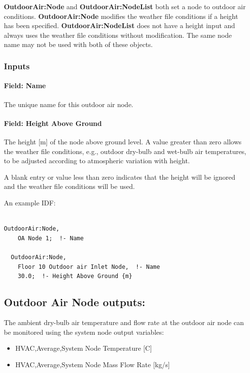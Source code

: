 \textbf{OutdoorAir:Node} and \textbf{OutdoorAir:NodeList} both set a node to outdoor air conditions. \textbf{OutdoorAir:Node} modifies the weather file conditions if a height has been specified. \textbf{OutdoorAir:NodeList} does not have a height input and always uses the weather file conditions without modification. The same node name may not be used with both of these objects.

\subsubsection{Inputs}\label{inputs-5-001}

\paragraph{Field: Name}\label{field-name-5-001}

The unique name for this outdoor air node.

\paragraph{Field: Height Above Ground}\label{field-height-above-ground}

The height {[}m{]} of the node above ground level. A value greater than zero allows the weather file conditions, e.g., outdoor dry-bulb and wet-bulb air temperatures, to be adjusted according to atmospheric variation with height.

A blank entry or value less than zero indicates that the height will be ignored and the weather file conditions will be used.

An example IDF:

\begin{lstlisting}

OutdoorAir:Node,
    OA Node 1;  !- Name

  OutdoorAir:Node,
    Floor 10 Outdoor air Inlet Node,  !- Name
    30.0;  !- Height Above Ground {m}
\end{lstlisting}

\subsection{Outdoor Air Node outputs:}\label{outdoor-air-node-outputs}

The ambient dry-bulb air temperature and flow rate at the outdoor air node can be monitored using the system node output variables:

\begin{itemize}
\item
  HVAC,Average,System Node Temperature {[}C{]}
\item
  HVAC,Average,System Node Mass Flow Rate {[}kg/s{]}
\end{itemize}

